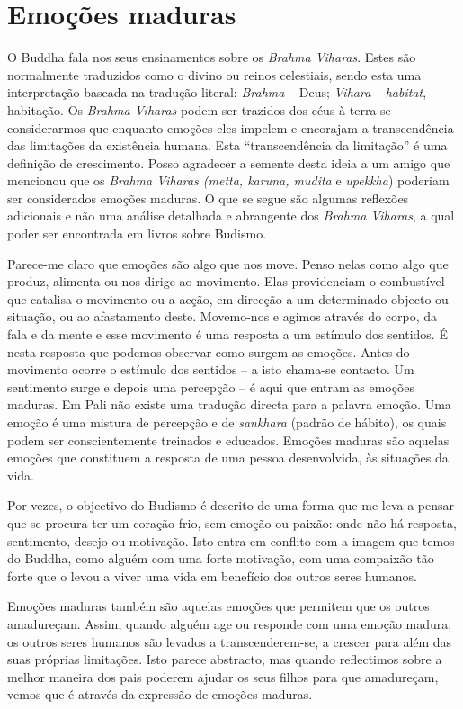 \chapter{Emoções maduras}

O Buddha fala nos seus ensinamentos sobre os \emph{Brahma Viharas}.
Estes são normalmente traduzidos como o divino ou reinos celestiais,
sendo esta uma interpretação baseada na tradução literal: \emph{Brahma}
-- Deus; \emph{Vihara} -- \emph{habitat}, habitação. Os \emph{Brahma
Viharas} podem ser trazidos dos céus à terra se considerarmos que
enquanto emoções eles impelem e encorajam a transcendência das
limitações da existência humana. Esta ``transcendência da limitação'' é
uma definição de crescimento. Posso agradecer a semente desta ideia a um
amigo que mencionou que os \emph{Brahma Viharas (metta, karuna, mudita}
e \emph{upekkha}) poderiam ser considerados emoções maduras. O que se
segue são algumas reflexões adicionais e não uma análise detalhada e
abrangente dos \emph{Brahma Viharas}, a qual poder ser encontrada em
livros sobre Budismo.

Parece-me claro que emoções são algo que nos move. Penso nelas como algo
que produz, alimenta ou nos dirige ao movimento. Elas providenciam o
combustível que catalisa o movimento ou a acção, em direcção a um
determinado objecto ou situação, ou ao afastamento deste. Movemo-nos e
agimos através do corpo, da fala e da mente e esse movimento é uma
resposta a um estímulo dos sentidos. É nesta resposta que podemos
observar como surgem as emoções. Antes do movimento ocorre o estímulo
dos sentidos -- a isto chama-se contacto. Um sentimento surge e depois
uma percepção -- é aqui que entram as emoções maduras. Em Pali não
existe uma tradução directa para a palavra emoção. Uma emoção é uma
mistura de percepção e de \emph{sankhara} (padrão de hábito), os quais
podem ser conscientemente treinados e educados. Emoções maduras são
aquelas emoções que constituem a resposta de uma pessoa desenvolvida, às
situações da vida.

Por vezes, o objectivo do Budismo é descrito de uma forma que me leva a
pensar que se procura ter um coração frio, sem emoção ou paixão: onde
não há resposta, sentimento, desejo ou motivação. Isto entra em conflito
com a imagem que temos do Buddha, como alguém com uma forte motivação,
com uma compaixão tão forte que o levou a viver uma vida em benefício
dos outros seres humanos.

Emoções maduras também são aquelas emoções que permitem que os outros
amadureçam. Assim, quando alguém age ou responde com uma emoção madura,
os outros seres humanos são levados a transcenderem-se, a crescer para
além das suas próprias limitações. Isto parece abstracto, mas quando
reflectimos sobre a melhor maneira dos pais poderem ajudar os seus
filhos para que amadureçam, vemos que é através da expressão de emoções
maduras.

